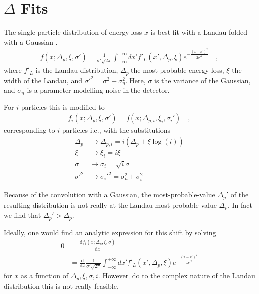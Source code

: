 \documentclass[compat,11pt]{alicenote}
\newcommand\FIXME[1]{\marginpar{\raggedright\textbf{FIXME:} #1}}
\begin{document}
\clearpage
\section{$\Delta$ Fits}
\label{sec:fits}

\FIXME{Example plots}
The single particle distribution of energy loss $x$ is best fit with a
Landau folded with a Gaussian \cite{nim:b1:16,phyrev:a28:615}.
\begin{align} 
  \label{eq:f}
 f(x;\Delta_p,\xi,\sigma') = \frac{1}{\sigma' \sqrt{2 \pi}}
 \int_{-\infty}^{+\infty} dx' f'_{L}(x',\Delta_p,\xi)
 e^{-\frac{(x-x')^2}{2\sigma'^2}}\quad,
\end{align}
where $ f'_{L}$ is the Landau distribution, $\Delta_p$ the most
probable energy loss, $ \xi$ the width of the Landau, and $
\sigma'^2=\sigma^2-\sigma_n^2 $.  Here, $\sigma$ is the variance of
the Gaussian, and $\sigma_n$ is a parameter modelling noise in the
detector.

For $i$ particles this is modified to 
\begin{align}
  f_i(x;\Delta_{p},\xi,\sigma')=f(x;\Delta_{p,i},\xi_i,\sigma_i')\quad,
\end{align}
corresponding to $ i$ particles i.e., with the substitutions 
\begin{align*}
  \Delta_p  &\rightarrow \Delta_{p,i} = i\left(\Delta_p + \xi\log(i)\right)\\
  \xi       &\rightarrow \xi_i       = i \xi\\
  \sigma    &\rightarrow \sigma_i    = \sqrt{i}\sigma\\
  \sigma'^2 &\rightarrow \sigma_i'^2 = \sigma_n^2 + \sigma_i^2
\end{align*}

Because of the convolution with a Gaussian, the most-probable-value
$\Delta_p'$ of the resulting distribution is not really at the
Landau most-probable-value $\Delta_p$.  In fact we find that
$\Delta_p' > \Delta_p$.

Ideally, one would find an analytic expression for this shift by
solving
\begin{align*}
  0 &= \frac{\text{d} f_i(x;\Delta_p,\xi,\sigma)}{\text{d}x}\nonumber\\
    &= \frac{\text{d}}{\text{d}x}\frac{1}{\sigma' \sqrt{2 \pi}}
     \int_{-\infty}^{+\infty} dx' f'_{L}(x',\Delta_p,\xi)
     e^{-\frac{(x-x')^2}{2\sigma'^2}}
\end{align*}
for $x$ as a function of $\Delta_p,\xi,\sigma,i$. However,
do to the complex nature of the Landau distribution this is not
really feasible.
\end{document}
